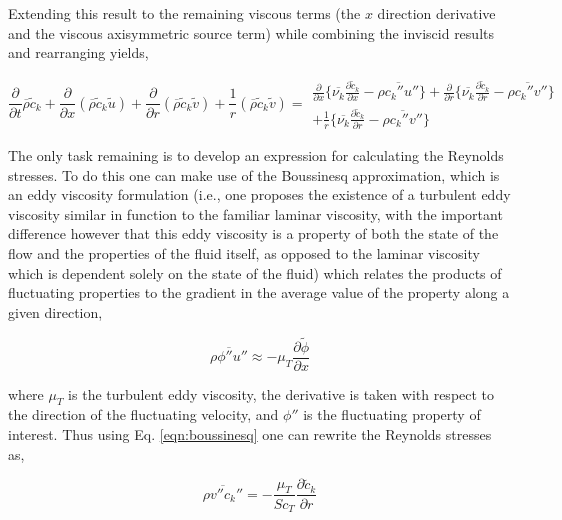 	Extending this result to the remaining viscous terms (the $x$ direction derivative and the viscous axisymmetric 
source term) while combining the inviscid results and rearranging yields,

\begin{displaymath}
	\frac{\partial}{\partial t}\overline{\rho}\tilde c_k + \frac{\partial}{\partial x}
	(\overline{\rho}\tilde c_k\tilde{u})  + \frac{\partial}{\partial r}
	(\overline{\rho}\tilde c_k\tilde{v})	+ \frac{1}{r}
	(\overline{\rho}\tilde c_k\tilde{v})  = 
	\begin{array}{c}
		\frac{\partial}{\partial x}\Big\{
		\overline{\nu_k}\frac{\partial \tilde c_k}{\partial x} - \overline{\rho c_k'' u''}\Big\} +
		\frac{\partial}{\partial r} \Big\{\overline{\nu_k}\frac{\partial \tilde c_k}{\partial r} 
		- \overline{\rho c_k'' v''}\Big\} \\
		+ \frac{1}{r}\Big\{\overline{\nu_k}\frac{\partial \tilde c_k}{\partial r} 
		- \overline{\rho c_k'' v''}\Big\}
	\end{array}
\end{displaymath}

	The only task remaining is to develop an expression for calculating the Reynolds stresses.  To do this one
can make use of the Boussinesq approximation, which is an eddy viscosity formulation (i.e., one proposes the existence
of a turbulent eddy viscosity similar in function to the familiar laminar viscosity, with the important difference however
that this eddy viscosity is a property of both the state of the flow and the properties of the fluid itself, as opposed to 
the laminar viscosity which is dependent solely on the state of the fluid) which relates the products of fluctuating 
properties to the gradient in the average value of the property along a given direction,

\begin{equation}
	\overline{\rho \phi'' u''} \approx -\mu_T \frac{\partial \tilde{\phi}}{\partial x}
\label{eqn:boussinesq}
\end{equation}

	where $\mu_T$ is the turbulent eddy viscosity, the derivative is taken with respect to the 
direction of the fluctuating velocity, and $\phi ''$ is the fluctuating property of interest.  Thus using 
Eq. \ref{eqn:boussinesq} one can rewrite the Reynolds stresses as,

\begin{equation}
	\overline{\rho v'' c_k''} = -\frac{\mu_T}{Sc_T}\frac{\partial \tilde c_k}{\partial r}
\label{eqn:turbdiffapprox}
\end{equation}	

